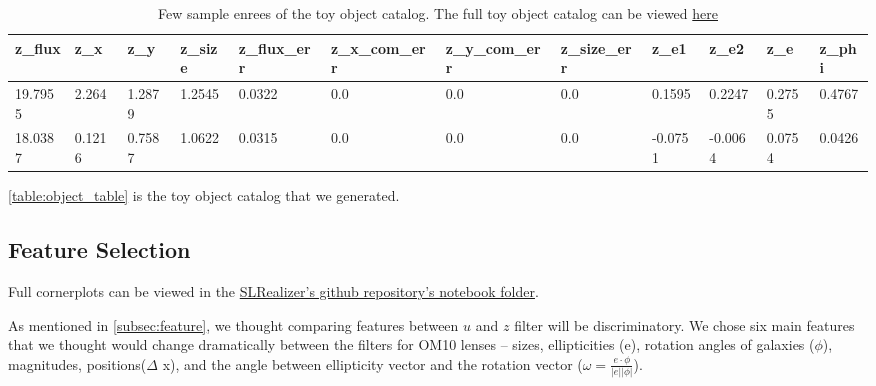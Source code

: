 \documentclass[\docopts]{\docclass}
\begin{document}
\begin{table}[!h]
\begin{tabular}{|l|l|l|l|l|l|l|l|l|l|l|l|}
\hline
z\_flux & z\_x   & z\_y   & z\_size & z\_flux\_err & z\_x\_com\_err & z\_y\_com\_err & z\_size\_err & z\_e1   & z\_e2   & z\_e   & z\_phi \\ \hline
19.7955 & 2.264  & 1.2879 & 1.2545  & 0.0322       & 0.0            & 0.0            & 0.0          & 0.1595  & 0.2247  & 0.2755 & 0.4767 \\
18.0387 & 0.1216 & 0.7587 & 1.0622  & 0.0315       & 0.0            & 0.0            & 0.0          & -0.0751 & -0.0064 & 0.0754 & 0.0426 \\ \hline
\end{tabular}

\caption{Few sample enrees of the toy object catalog. The full toy object catalog can be viewed \href{https://www.dropbox.com/s/ob51rxjexzuervl/toy_object_catalog.csv?dl=0}{here}}

\end{table}

\ref{table:object_table} is the toy object catalog that we generated.

\subsection{Feature Selection}
\label{subsec:feature_data}

Full cornerplots can be viewed in the \href{https://github.com/jennykim1016/SLRealizer/blob/master/notebooks/SDSSvsOM10.ipynb}{SLRealizer's github repository's notebook folder}.

As mentioned in \ref{subsec:feature}, we thought comparing features between $u$ and $z$ filter will be discriminatory. We chose six main features that we thought would change dramatically between the filters for OM10 lenses -- sizes, ellipticities (e), rotation angles of galaxies ($\phi$), magnitudes, positions($\Delta$ x), and the angle between ellipticity vector and the rotation vector ($\omega = \frac{e \cdot \phi}{ \left | e \right | \left | \phi \right |}$).
\end{document}
